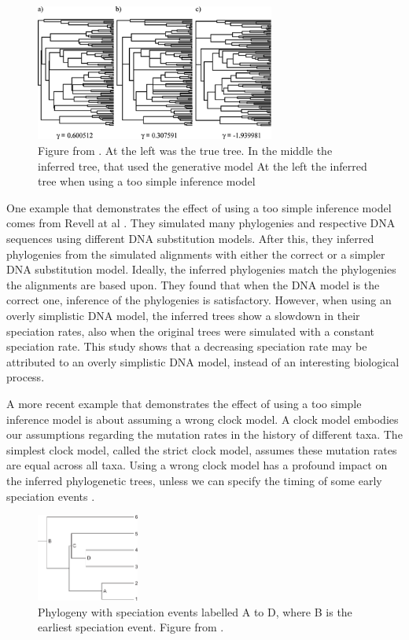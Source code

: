 \begin{figure}[H]
  \includegraphics[width=0.7\textwidth]{revell2005under.png}
  \caption{
    Figure from \cite{revell2005under}. At the left was the true tree.
    In the middle the inferred tree, that used the generative model
    At the left the inferred tree when using a too simple inference model 
 }
  \label{fig:revell2005under}
\end{figure}

One example that demonstrates the effect of using a too simple inference model
comes from Revell at al \cite{revell2005under}.
They simulated many phylogenies and respective DNA sequences 
using different DNA substitution models. 
After this, they inferred phylogenies from the simulated alignments
with either the correct or a simpler DNA substitution model. 
Ideally, the inferred phylogenies match the phylogenies the alignments are based upon.
They found that when the DNA model is the correct one, inference of the
phylogenies is satisfactory.
However, when using an overly simplistic DNA model, 
the inferred trees show a slowdown in their speciation rates, 
also when the original trees were simulated with a constant speciation rate.
This study shows that a decreasing speciation rate may be attributed
to an overly simplistic DNA model, instead of an interesting biological process.

A more recent example that demonstrates the effect of using a too simple 
inference model is about assuming a wrong clock model. 
A clock model embodies our assumptions regarding the mutation rates in
the history of different taxa. The simplest clock model, called the strict
clock model, assumes these mutation rates are equal across all taxa.
Using a wrong clock model has a profound impact 
on the inferred phylogenetic trees, unless we can
specify the timing of some early speciation events \cite{duchene2014impact}.

\begin{figure}[H]
  \includegraphics[width=0.3\textwidth]{duchene_et_al_2014_fig_1.png}
  \caption{
    Phylogeny with speciation events labelled A to D,
    where B is the earliest speciation event.
    Figure from \cite{duchene2014impact}.
 }
  \label{fig:duchene2014impact}
\end{figure}

